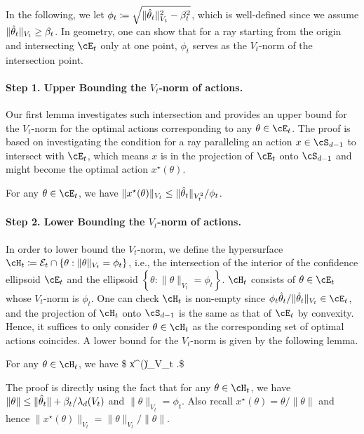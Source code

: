 In the following, we let
$
\phi_t	 \coloneqq \sqrt{ \|\hat{\theta}_t\|_{V_t}^2 - \beta_t^2 }
$, which is well-defined since we assume $\|\hat{\theta}_t\|_{V_t}  \geq \beta_t$. In geometry,  one can show that for a ray starting from the origin and intersecting $\cE_t$ only at one point, $\phi_t$ serves as the ${V_t}$-norm of the intersection point. 

\paragraph{Step 1. Upper Bounding the $V_t$-norm of actions.}
Our first lemma investigates such intersection and provides an upper bound for the  $V_t$-norm for the optimal actions corresponding to any $\theta\in \cE_t$. The proof is based on investigating the condition for a ray paralleling an action $x \in \cS_{d-1}$ to intersect with $\cE_t$, which means $x$ is in the projection of $\cE_t$ onto $\cS_{d-1}$ and might become the optimal action $x^\star(\theta)$. 


\begin{lemma}\label{lem:Vt_norm_upper}
For any $\theta\in \cE_t$, we have
	$
	\|x^\star(\theta )\|_{V_t} \leq  \|\hat{\theta}_t\|_{V_t^2}/\phi_t$.
\end{lemma}


   



\paragraph{Step 2. Lower Bounding the $V_t$-norm of actions.}

In order to lower bound the $V_t$-norm, we define the hypersurface  
$
\cH_t \coloneqq \mathcal{E}_t\cap\left\{\theta:\|\theta\|_{V_t}=\phi_t\right\}
$, 
i.e., the intersection of the interior of the confidence ellipsoid  $\cE_t$ and the ellipsoid $\left\{\theta:\|\theta\|_{V_t}=\phi_t\right\}$.
$\cH_t$  consists of $\theta \in \cE_t$ whose $V_t$-norm is $\phi_t$. One can check $\cH_t$ is non-empty since $ \phi_t  \hparam_t  /\|\hparam_t\|_{V_t}  \in \cE_t$, and  the projection of $\cH_t$  onto $\cS_{d-1}$ is the same as that of $\cE_t$ by convexity. Hence,  it suffices to only consider  $\theta \in \cH_t$ as the corresponding set of optimal actions coincides. A lower bound for the $V_t$-norm is given by the following lemma.



\begin{lemma}
\label{lem:Vt_norm_lower}
	For any $\theta\in \cH_t$, we have
	\$
	  \|x^\star(\theta )\|_{V_t} \geq {}.\$
\end{lemma}
The proof is directly using the fact that for any $ \theta \in \cH_t$, we have $\|\theta\| \leq \|\hat{\theta}_t\| +  \beta_t/\lambda_d(V_t)  $ and $\|\theta\|_{V_t}  =  \phi_t$. Also recall  $x^\star(\theta ) = \theta /\|\theta\|$ and hence $\|x^\star(\theta )\|_{V_t} =  \|\theta\|_{V_t} / \|\theta\|$. 










